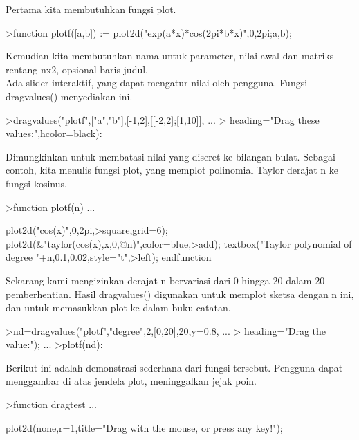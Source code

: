 \documentclass[a4paper,10pt]{article}
\begin{document}
\begin{eulernotebook}
\begin{eulercomment}
\begin{eulercomment}
\begin{eulercomment}
\begin{eulercomment}
\begin{eulercomment}
\begin{eulercomment}
\begin{eulercomment}
Pertama kita membutuhkan fungsi plot.
\end{eulercomment}
\begin{eulerprompt}
>function plotf([a,b]) := plot2d("exp(a*x)*cos(2pi*b*x)",0,2pi;a,b);
\end{eulerprompt}
\begin{eulercomment}
Kemudian kita membutuhkan nama untuk parameter, nilai awal dan matriks
rentang nx2, opsional baris judul.\\
Ada slider interaktif, yang dapat mengatur nilai oleh pengguna. Fungsi
dragvalues() menyediakan ini.
\end{eulercomment}
\begin{eulerprompt}
>dragvalues("plotf",["a","b"],[-1,2],[[-2,2];[1,10]], ...
>  heading="Drag these values:",hcolor=black):
\end{eulerprompt}
\begin{eulercomment}
Dimungkinkan untuk membatasi nilai yang diseret ke bilangan bulat.
Sebagai contoh, kita menulis fungsi plot, yang memplot polinomial
Taylor derajat n ke fungsi kosinus.
\end{eulercomment}
\begin{eulerprompt}
>function plotf(n) ...
\end{eulerprompt}
\begin{eulerudf}
  plot2d("cos(x)",0,2pi,>square,grid=6);
  plot2d(&"taylor(cos(x),x,0,@n)",color=blue,>add);
  textbox("Taylor polynomial of degree "+n,0.1,0.02,style="t",>left);
  endfunction
\end{eulerudf}
\begin{eulercomment}
Sekarang kami mengizinkan derajat n bervariasi dari 0 hingga 20 dalam
20 pemberhentian. Hasil dragvalues() digunakan untuk memplot sketsa
dengan n ini, dan untuk memasukkan plot ke dalam buku catatan.
\end{eulercomment}
\begin{eulerprompt}
>nd=dragvalues("plotf","degree",2,[0,20],20,y=0.8, ...
>   heading="Drag the value:"); ...
>plotf(nd):
\end{eulerprompt}
\begin{eulercomment}
Berikut ini adalah demonstrasi sederhana dari fungsi tersebut.
Pengguna dapat menggambar di atas jendela plot, meninggalkan jejak
poin.
\end{eulercomment}
\begin{eulerprompt}
>function dragtest ...
\end{eulerprompt}
\begin{eulerudf}
    plot2d(none,r=1,title="Drag with the mouse, or press any key!");

\end{eulerudf}
\end{eulercomment}
\end{eulercomment}
\end{eulercomment}
\end{eulercomment}
\end{eulercomment}
\end{eulercomment}
\end{eulernotebook}
\end{document}
